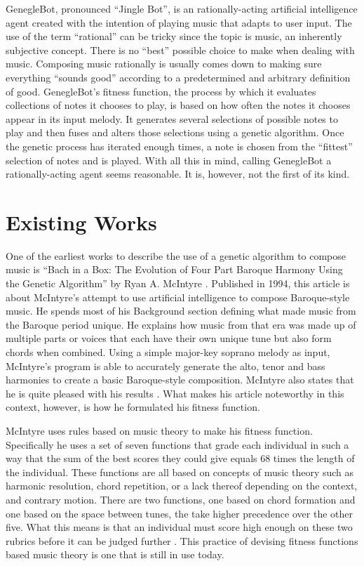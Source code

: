 \documentclass[conference]{IEEEtran}
\begin{document}
GenegleBot, pronounced “Jingle Bot”, is an rationally-acting artificial intelligence  agent created with the intention of playing music that adapts to user input.  The use of the term “rational” can be tricky since the topic is music, an inherently subjective concept.  There is no “best” possible choice to make when dealing with music.  Composing music rationally is usually comes down to making sure everything “sounds good” according to a predetermined and arbitrary definition of good.  GenegleBot’s fitness function, the process by which it evaluates collections of notes it chooses to play, is based on how often the notes it chooses appear in its input melody.  It generates several selections of possible notes to play and then fuses and alters those selections using a genetic algorithm.  Once the genetic process has iterated enough times, a note is chosen from the “fittest” selection of notes and is played.  With all this in mind, calling GenegleBot a rationally-acting agent seems reasonable.  It is, however, not the first of its kind.


\section{Existing Works}
One of the earliest works to describe the use of a genetic algorithm to compose music is “Bach in a Box: The Evolution of Four Part Baroque Harmony Using the Genetic Algorithm” by Ryan A. McIntyre \cite{b2}. Published in 1994, this article is about McIntyre's attempt to use artificial intelligence to compose Baroque-style music. He spends most of his Background section defining what made music from the Baroque period unique. He explains how music from that era was made up of multiple parts or voices that each have their own unique tune but also form chords when combined. Using a simple major-key soprano melody as input, McIntyre's program is able to accurately generate the alto, tenor and bass harmonies to create a basic Baroque-style composition. McIntyre also states that he is quite pleased with his results \cite{b2}. What makes his article noteworthy in this context, however, is how he formulated his fitness function.

McIntyre uses rules based on music theory to make his fitness function. Specifically he uses a set of seven functions that grade each individual in such a way that the sum of the best scores they could give equals 68 times the length of the individual. These functions are all based on concepts of music theory such as harmonic resolution, chord repetition, or a lack thereof depending on the context, and contrary motion. There are two functions, one based on chord formation and one based on the space between tunes, the take higher precedence over the other five. What this means is that an individual must score high enough on these two rubrics before it can be judged further \cite{b2}.  This practice of devising fitness functions based music theory is one that is still in use today.
\end{document}

